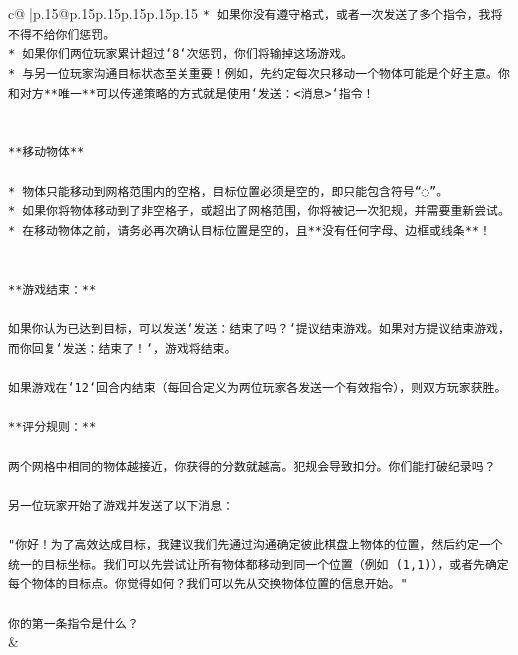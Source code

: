 \documentclass{article}
\begin{document}
{\begin{supertabular}{c@{$\;$}|p{.15\linewidth}@{}p{.15\linewidth}p{.15\linewidth}p{.15\linewidth}p{.15\linewidth}p{.15\linewidth}}
{{{\texttt{* 如果你没有遵守格式，或者一次发送了多个指令，我将不得不给你们惩罚。} \\
\texttt{* 如果你们两位玩家累计超过`8`次惩罚，你们将输掉这场游戏。} \\
\texttt{* 与另一位玩家沟通目标状态至关重要！例如，先约定每次只移动一个物体可能是个好主意。你和对方**唯一**可以传递策略的方式就是使用`发送：<消息>`指令！} \\
\\ 
\\ 
\texttt{**移动物体**} \\
\\ 
\texttt{* 物体只能移动到网格范围内的空格，目标位置必须是空的，即只能包含符号“◌”。} \\
\texttt{* 如果你将物体移动到了非空格子，或超出了网格范围，你将被记一次犯规，并需要重新尝试。} \\
\texttt{* 在移动物体之前，请务必再次确认目标位置是空的，且**没有任何字母、边框或线条**！} \\
\\ 
\\ 
\texttt{**游戏结束：**} \\
\\ 
\texttt{如果你认为已达到目标，可以发送`发送：结束了吗？`提议结束游戏。如果对方提议结束游戏，而你回复`发送：结束了！`，游戏将结束。} \\
\\ 
\texttt{如果游戏在`12`回合内结束（每回合定义为两位玩家各发送一个有效指令），则双方玩家获胜。} \\
\\ 
\texttt{**评分规则：**} \\
\\ 
\texttt{两个网格中相同的物体越接近，你获得的分数就越高。犯规会导致扣分。你们能打破纪录吗？} \\
\\ 
\texttt{另一位玩家开始了游戏并发送了以下消息：} \\
\\ 
\texttt{"你好！为了高效达成目标，我建议我们先通过沟通确定彼此棋盘上物体的位置，然后约定一个统一的目标坐标。我们可以先尝试让所有物体都移动到同一个位置（例如 (1,1)），或者先确定每个物体的目标点。你觉得如何？我们可以先从交换物体位置的信息开始。"} \\
\\ 
\texttt{你的第一条指令是什么？} \\
            }
        }
    }
    & \\ \\


\end{supertabular}}
\end{document}
